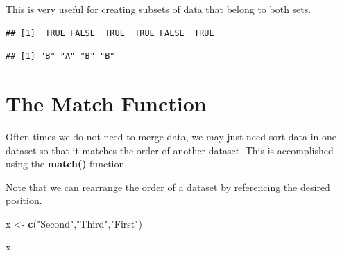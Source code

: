 \documentclass[]{book}
\newenvironment{Shaded}{\begin{snugshade}}{\end{snugshade}}
\newcommand{\CommentTok}[1]{\textcolor[rgb]{0.56,0.35,0.01}{\textit{#1}}}
\newcommand{\KeywordTok}[1]{\textcolor[rgb]{0.13,0.29,0.53}{\textbf{#1}}}
\newcommand{\NormalTok}[1]{#1}
\newcommand{\OperatorTok}[1]{\textcolor[rgb]{0.81,0.36,0.00}{\textbf{#1}}}
\newcommand{\StringTok}[1]{\textcolor[rgb]{0.31,0.60,0.02}{#1}}
\theoremstyle{definition}
\theoremstyle{definition}
\theoremstyle{definition}
\theoremstyle{remark}
\begin{document}
This is very useful for creating subsets of data that belong to both
sets.

\begin{Shaded}
\end{Shaded}

\begin{verbatim}
## [1]  TRUE FALSE  TRUE  TRUE FALSE  TRUE
\end{verbatim}

\begin{Shaded}
\end{Shaded}

\begin{verbatim}
## [1] "B" "A" "B" "B"
\end{verbatim}

\hypertarget{the-match-function}{%
\section{The Match Function}\label{the-match-function}}

Often times we do not need to merge data, we may just need sort data in
one dataset so that it matches the order of another dataset. This is
accomplished using the \textbf{match()} function.

Note that we can rearrange the order of a dataset by referencing the
desired position.

\begin{Shaded}
\begin{Highlighting}[]
\NormalTok{x <-}\StringTok{ }\KeywordTok{c}\NormalTok{(}\StringTok{"Second"}\NormalTok{,}\StringTok{"Third"}\NormalTok{,}\StringTok{"First"}\NormalTok{)}

\NormalTok{x}
\end{Highlighting}
\end{Shaded}
\end{document}
